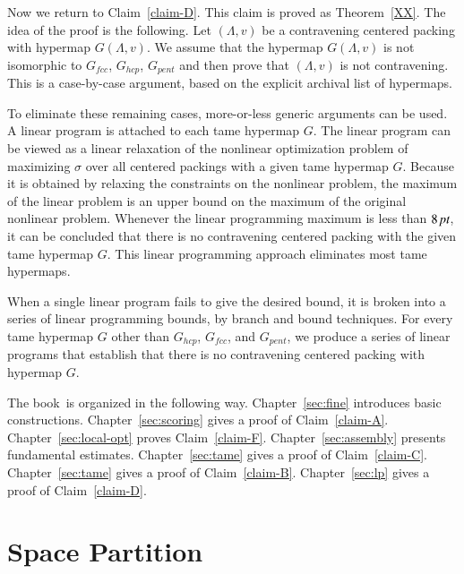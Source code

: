 Now we return to Claim~\ref{claim-D}. This claim is proved as
Theorem~\ref{XX}.  The idea of the proof is the
following.  Let $(\Lambda,v)$ be a contravening centered packing with
hypermap $G(\Lambda,v)$. We assume that the hypermap $G(\Lambda,v)$ is not
isomorphic to $G_{fcc}$, $G_{hcp}$, $G_{pent}$ and then prove that
$(\Lambda,v)$ is not contravening. This is a case-by-case argument, based on
the explicit archival list of hypermaps.

To eliminate these remaining cases, more-or-less generic arguments
can be used.  A linear program is attached to each tame hypermap
$G$. The linear program can be viewed as a linear relaxation of
the nonlinear optimization problem of maximizing $\sigma$ over all
centered packings with a given tame hypermap $G$. Because it is
obtained by relaxing the constraints on the nonlinear problem, the
maximum of the linear problem is an upper bound on the maximum of
the original nonlinear problem. Whenever the linear programming
maximum is less than $8\,\hbox{\it pt}$, it can be concluded that there is
no contravening centered packing with the given tame hypermap $G$.
This linear programming approach eliminates most tame hypermaps.

When a single linear program fails to give the desired bound, it
is broken into a series of linear programming bounds, by branch
and bound techniques.  For every tame hypermap $G$ other than
$G_{hcp}$, $G_{fcc}$, and $G_{pent}$, we
produce a series of linear programs that establish that there is
no contravening centered packing with hypermap $G$.

The book~is organized in the following way.
Chapter~\ref{sec:fine} introduces
basic constructions.  Chapter~\ref{sec:scoring} gives a proof of
Claim~\ref{claim-A}. Chapter~\ref{sec:local-opt} proves
Claim~\ref{claim-F}. Chapter~\ref{sec:assembly}
presents  fundamental estimates. Chapter~\ref{sec:tame}
gives a proof of
Claim~\ref{claim-C}. Chapter~\ref{sec:tame} gives 
a proof of Claim~\ref{claim-B}.
Chapter~\ref{sec:lp} gives
a proof of Claim~\ref{claim-D}.


\section{Space Partition}





